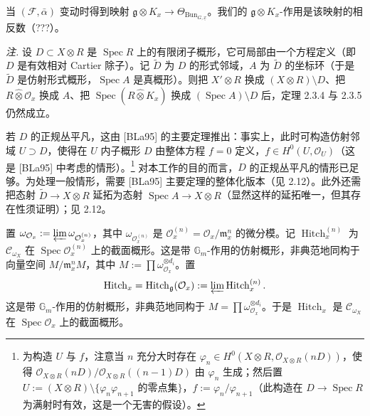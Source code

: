 
当 $(\mathcal{F},\bar\alpha)$ 变动时得到映射 $\mathfrak{g}\otimes K_x\to\Theta_{\operatorname{Bun}_{G,\underline{x}}}$。我们的 $\mathfrak{g}\otimes K_x$-作用是该映射的相反数（???）。

 \emph{注.} 设 $D\subset X\otimes R$ 是 $\operatorname{Spec}R$ 上的有限闭子概形，它可局部由一个方程定义（即 $D$ 是有效相对 Cartier 除子）。记 $\tilde{D}$ 为 $D$ 的形式邻域，$A$ 为 $\tilde{D}$ 的坐标环（于是 $\tilde{D}$ 是仿射形式概形，$\operatorname{Spec}A$ 是真概形）。则把 $X'\otimes R$ 换成 $(X\otimes R)\setminus D$、把 $R\widehat{\otimes}\mathcal{O}_x$ 换成 $A$、把 $\operatorname{Spec}(R\widehat{\otimes}K_x)$ 换成 $(\operatorname{Spec}A)\setminus D$ 后，定理 2.3.4 与 2.3.5 仍然成立。

若 $D$ 的正规丛平凡，这由 [BLa95] 的主要定理推出：事实上，此时可构造仿射邻域 $U\supset D$，使得在 $U$ 内子概形 $D$ 由整体方程 $f=0$ 定义，$f\in H^{0}(U,\mathcal{O}_U)$（这是 [BLa95] 中考虑的情形）。\footnote{为构造 $U$ 与 $f$，注意当 $n$ 充分大时存在 $\varphi_n\in H^{0}(X\otimes R,\mathcal{O}_{X\otimes R}(nD))$，使得 $\mathcal{O}_{X\otimes R}(nD)/\mathcal{O}_{X\otimes R}((n-1)D)$ 由 $\varphi_n$ 生成；然后置 $U:=(X\otimes R)\setminus\{\varphi_n\varphi_{n+1}\text{ 的零点集}\}$，$f:=\varphi_n/\varphi_{n+1}$（此构造在 $D\to\operatorname{Spec}R$ 为满射时有效，这是一个无害的假设）。} 对本工作的目的而言，$D$ 的正规丛平凡的情形已足够。为处理一般情形，需要 [BLa95] 主要定理的整体化版本（见 2.12）。此外还需把态射 $\tilde{D}\to X\otimes R$ 延拓为态射 $\operatorname{Spec}A\to X\otimes R$（显然这样的延拓唯一，但其存在性须证明）；见 2.12。


 置 $\omega_{\mathcal{O}_x}:=\varprojlim\omega_{\mathcal{O}_x^{(n)}}$，其中 $\omega_{\mathcal{O}_x^{(n)}}$ 是 $\mathcal{O}_x^{(n)}=\mathcal{O}_x/\mathfrak{m}_x^{n}$ 的微分模。记 $\operatorname{Hitch}_x^{(n)}$ 为 $\mathcal{C}_{\omega_X}$ 在 $\operatorname{Spec}\mathcal{O}_x^{(n)}$ 上的截面概形。这是带 $\mathbb{G}_m$-作用的仿射概形，非典范地同构于向量空间 $M/\mathfrak{m}_x^{n}M$，其中 $M:=\prod\omega_{\mathcal{O}_x}^{\otimes d_i}$。置
\[
\operatorname{Hitch}_x=\operatorname{Hitch}_{\mathfrak{g}}(\mathcal{O}_x):=\varprojlim\operatorname{Hitch}_x^{(n)}.
\]
这是带 $\mathbb{G}_m$-作用的仿射概形，非典范地同构于 $M=\prod\omega_{\mathcal{O}_x}^{\otimes d_i}$。于是 $\operatorname{Hitch}_x$ 是 $\mathcal{C}_{\omega_X}$ 在 $\operatorname{Spec}\mathcal{O}_x$ 上的截面概形。

